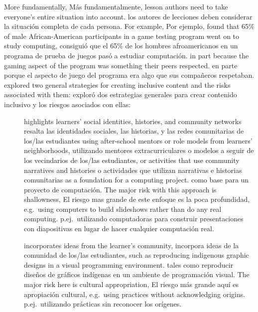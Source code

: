 More fundamentally,
Más fundamentalmente,
lesson authors need to take everyone's entire situation into account.
los autores de lecciones deben considerar la situación completa de cada persona.
For example,
Por ejemplo,
\cite{DiSa2014a} found that 65\% of male African-American participants in a game testing program went on to study computing,
\cite{DiSa2014a} consiguió que el 65\% de los hombres afroamericanos en un programa de prueba de juegos pasó a estudiar computación.
in part because the gaming aspect of the program was something their peers respected.
en parte porque el aspecto de juego del programa era algo que sus compañeros respetaban.
\cite{Lach2018} explored two general strategies for creating inclusive content
and the risks associated with them:
\cite{Lach2018} exploró dos estrategias generales para crear contenido inclusivo y los riesgos asociados con ellas:

\begin{description}

\item[{}]
\item[{}]
  highlights learners' social identities, histories, and community networks
  resalta las identidades sociales, las historias, y las redes comunitarias de los/las estudiantes
  using after-school mentors or role models from learners' neighborhoods,
  utilizando mentores extracurriculares o modelos a seguir de los vecindarios de los/las estudiantes,
  or activities that use community narratives and histories
  o actividades que utilizan narrativas e historias comunitarias
  as a foundation for a computing project.
  como base para un proyecto de computación.
  The major risk with this approach is shallowness,
  El riesgo mas grande de este enfoque es la poca profundidad,
  e.g.\ using computers to build slideshows rather than do any real computing.
  p.ej.\ utilizando computadoras para construir presentaciones con diapositivas en lugar de hacer cualquier computación real.

\item[{}]
\item[{}]
  incorporates ideas from the learner's community,
  incorpora ideas de la comunidad de los/las estudiantes,
  such as reproducing indigenous graphic designs in a visual programming environment.
  tales como reproducir diseños de gráficos indígenas en un ambiente de programación visual.
  The major risk here is cultural appropriation,
  El riesgo más grande aquí es apropiación cultural,
  e.g.\ using practices without acknowledging origins.
  p.ej.\ utilizando prácticas sin reconocer los orígenes.

\end{description}

